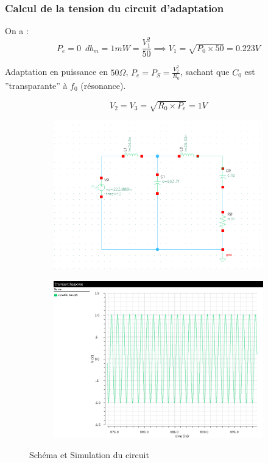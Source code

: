 \documentclass[a4paper]{article}
\begin{document}
\subsubsection{Calcul de la tension du circuit d'adaptation}
On a :
\[
P_e = 0 \phantom{4} db_{m} = 1 mW = \frac{V^2_1}{50} \implies V_1 = \sqrt{P_0 \times 50} = 0.223 V
\]

Adaptation en puissance en $50 \Omega$, $ P_e = P_S = \frac{V^2_2}{R_0}$, sachant que $C_0$ est ''transparante'' \`a $f_0$ (r\'esonance).

\[
  V_2 = V_3 = \sqrt{R_0 \times P_e} = 1 V
\]
\begin{figure}[!htb]
  \centering
  \begin{subfigure}[t]{.5\linewidth}
      \centering
      \includegraphics[width=1\linewidth]{V-Adaptation.png}
      \label{fig:Adaptation-V}
  \end{subfigure}%
  \begin{subfigure}[t]{.5\linewidth}
    \centering
    \includegraphics[width=1\linewidth]{V-Adaptation-sim.png}
    \label{fig:Adaptation-V-sim}
  \end{subfigure}%
  \caption{Sch\'ema et Simulation du circuit}
  \label{fig:Adaptation-sim}
\end{figure}
\end{document}
